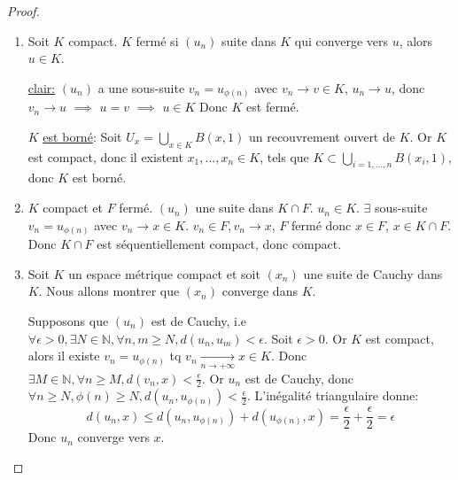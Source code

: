 \documentclass[a4paper]{article}
\newcommand{\N}{\mathbb{N}}
\begin{document}
\begin{proof}
   \begin{enumerate}
       \item Soit $K$ compact.  $K$ fermé si  $(u_n)$ suite dans  $K$ qui converge vers  $u$, alors  $u \in K$.
           \par
           \underline{clair:}  $(u_n)$ a une sous-suite  $v_n = u_{\phi(n)}$ avec $v_n \to v \in K$, $u_n \to u$, donc $v_n \to u$ $\implies$ $u = v$  $\implies$ $u \in K$
           Donc $K$ est fermé.
           \par
           $K$ \underline{est borné}:
           Soit $U_x = \bigcup_{x \in K} B(x, 1)$ un recouvrement ouvert de $K$. Or  $K$ est compact, donc il existent  $x_1, \ldots, x_n \in K$, tels que $K \subset \bigcup_{i = 1, \ldots, n} B(x_i, 1) $, donc $K$ est borné.
        \item $K$ compact et $F$ fermé. $(u_n)$ une suite dans $K \cap F$. $u_n \in K$. $ \exists$ sous-suite $v_n = u_{\phi(n)}$ avec $v_n \to x \in K$. $v_n \in F, v_n \to x$, $F$ fermé donc $x \in F$, $x \in K \cap F$. Donc $K \cap F$ est séquentiellement compact, donc compact.
        \item Soit $K$ un espace métrique compact et soit $(x_n)$ une suite de Cauchy dans $K$. Nous allons montrer que $(x_n)$ converge dans $K$.
            \par 
            Supposons que $(u_n)$ est de Cauchy, i.e  $\forall \epsilon > 0, \exists N \in \N, \forall n, m \ge N, d(u_n, u_m) < \epsilon$. Soit $\epsilon > 0$. Or  $K$ est compact, alors il existe  $v_n = u_{\phi(n)}$ tq  $v_n \xrightarrow[n \to +\infty]{} x \in K$. Donc $\exists M \in \N, \forall n \ge M, d(v_n, x) < \frac{\epsilon}{2}$. Or $u_n$ est de Cauchy, donc  $\forall n \ge N, \phi(n) \ge N, d(u_n, u_{\phi(n)}) < \frac{\epsilon}{2}$. L'inégalité triangulaire donne:
            \[
            d(u_n, x) \le d(u_n, u_{\phi(n)}) + d(u_{\phi(n)}, x) = \frac{\epsilon}{2} + \frac{\epsilon}{2} = \epsilon
            \] 
            Donc $u_n$ converge vers  $x$.
   \end{enumerate} 
\end{proof}
\end{document}
